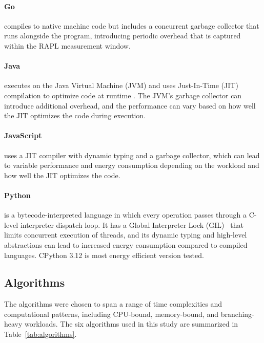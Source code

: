 \paragraph{Go} compiles to native machine code but includes a concurrent garbage collector that runs alongside the program, introducing periodic overhead that is captured within the RAPL measurement window. \cite{gogc}

\paragraph{Java} executes on the Java Virtual Machine (JVM) and uses Just-In-Time (JIT) compilation to optimize code at runtime \cite{barrett2017warmup}. The JVM's garbage collector can introduce additional overhead, and the performance can vary based on how well the JIT optimizes the code during execution.

\paragraph{JavaScript} uses a JIT compiler with dynamic typing and a garbage collector, which can lead to variable performance and energy consumption depending on the workload and how well the JIT optimizes the code.

\paragraph{Python} is a bytecode-interpreted language in which every operation passes through a C-level interpreter dispatch loop. It has a Global Interpreter Lock (GIL)~\cite{gil2026energy} that limits concurrent execution of threads, and its dynamic typing and high-level abstractions can lead to increased energy consumption compared to compiled languages. CPython 3.12 is most energy efficient version tested. \cite{inbook}



\subsection{Algorithms}

The algorithms were chosen to span a range of time complexities and computational patterns, including CPU-bound, memory-bound, and branching-heavy workloads. The six algorithms used in this study are summarized in Table~\ref{tab:algorithms}.

